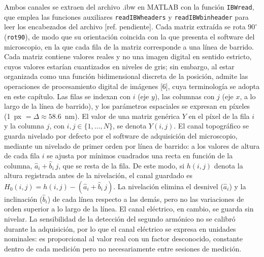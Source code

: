 Ambos canales se extraen del archivo .ibw en MATLAB con la función \texttt{IBWread}, que emplea las funciones auxiliares \texttt{readIBWheaders} y \texttt{readIBWbinheader} para leer los encabezados del archivo [ref. pendiente]. Cada matriz extraída se rota $90^\circ$ (\texttt{rot90}), de modo que su orientación coincida con la que presenta el software del microscopio, en la que cada fila de la matriz corresponde a una línea de barrido. Cada matriz contiene valores reales y no una imagen digital en sentido estricto, cuyos valores estarían cuantizados en niveles de gris; sin embargo, al estar organizada como una función bidimensional discreta de la posición, admite las operaciones de procesamiento digital de imágenes [6], cuya terminología se adopta en este capítulo. Las filas se indexan con $i$ (eje $y$), las columnas con $j$ (eje $x$, a lo largo de la línea de barrido), y los parámetros espaciales se expresan en píxeles (1~px $= \Delta \approx 58.6$~nm). El valor de una matriz genérica $Y$ en el píxel de la fila $i$ y la columna $j$, con $i, j \in \{1, \dots, N\}$, se denota $Y(i,j)$. El canal topográfico se guarda nivelado por defecto por el software de adquisición del microscopio, mediante un nivelado de primer orden por línea de barrido: a los valores de altura de cada fila $i$ se ajusta por mínimos cuadrados una recta en función de la columna, $\hat a_i + \hat b_i\, j$, que se resta de la fila. De este modo, si $h(i,j)$ denota la altura registrada antes de la nivelación, el canal guardado es $H_0(i,j) = h(i,j) - (\hat a_i + \hat b_i\, j)$. La nivelación elimina el desnivel ($\hat a_i$) y la inclinación ($\hat b_i$) de cada línea respecto a las demás, pero no las variaciones de orden superior a lo largo de la línea. El canal eléctrico, en cambio, se guarda sin nivelar. La sensibilidad de la detección del segundo armónico no se calibró durante la adquisición, por lo que el canal eléctrico se expresa en unidades nominales: es proporcional al valor real con un factor desconocido, constante dentro de cada medición pero no necesariamente entre sesiones de medición.


